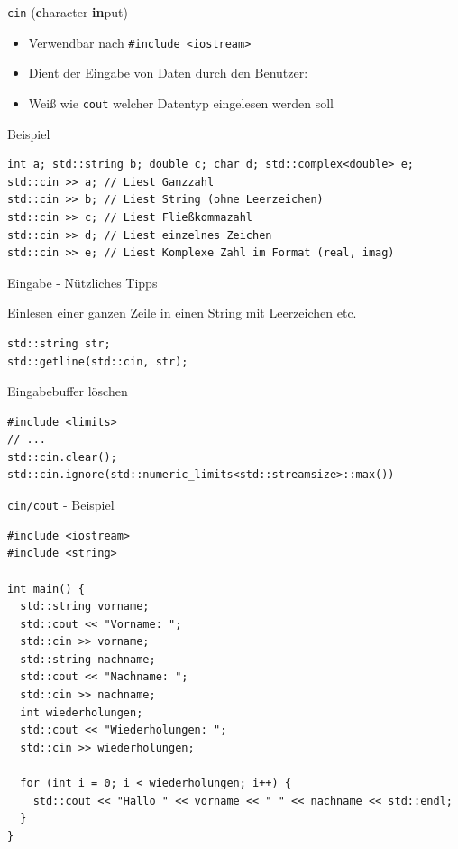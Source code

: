 \documentclass[presentation]{beamer}
\begin{document}
\begin{frame}[fragile,label={sec:org7846ab7}]{\texttt{cin} (\textbf{c}haracter \textbf{in}put)}
 \begin{itemize}
\item Verwendbar nach {\color{solarizedYellow}\texttt{\#include <iostream>}}
\item Dient der \alert{Eingabe} von Daten durch den Benutzer: 
\item Weiß wie {\color{solarizedYellow}\texttt{cout} }welcher Datentyp eingelesen werden soll
\end{itemize}
\begin{block}{Beispiel}
\begin{verbatim}
int a; std::string b; double c; char d; std::complex<double> e;
std::cin >> a; // Liest Ganzzahl
std::cin >> b; // Liest String (ohne Leerzeichen)
std::cin >> c; // Liest Fließkommazahl
std::cin >> d; // Liest einzelnes Zeichen
std::cin >> e; // Liest Komplexe Zahl im Format (real, imag)
\end{verbatim}
\end{block}
\end{frame}
\begin{frame}[fragile,label={sec:org44a55f4}]{Eingabe - Nützliches Tipps}
 \begin{block}{Einlesen einer ganzen Zeile in einen String mit Leerzeichen etc.}
\begin{verbatim}
std::string str;
std::getline(std::cin, str);
\end{verbatim}
\end{block}
\begin{block}{Eingabebuffer löschen}
\begin{verbatim}
#include <limits>
// ...
std::cin.clear();
std::cin.ignore(std::numeric_limits<std::streamsize>::max())
\end{verbatim}
\end{block}
\end{frame}
\begin{frame}[fragile,label={sec:orgfa4c589}]{\texttt{cin/cout} - Beispiel}
 \begin{verbatim}
#include <iostream>
#include <string>

int main() {
  std::string vorname;
  std::cout << "Vorname: ";
  std::cin >> vorname;
  std::string nachname;
  std::cout << "Nachname: ";
  std::cin >> nachname;
  int wiederholungen;
  std::cout << "Wiederholungen: ";
  std::cin >> wiederholungen;

  for (int i = 0; i < wiederholungen; i++) {
    std::cout << "Hallo " << vorname << " " << nachname << std::endl;
  }
}
\end{verbatim}
\end{frame}
\end{document}
